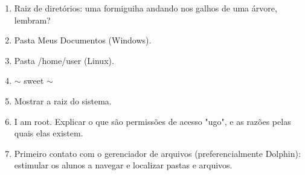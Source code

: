 \begin{enumerate}
	\item Raiz de diretórios: uma formiguiha andando nos galhos de uma árvore, lembram?
	\item Pasta Meus Documentos (Windows).
	\item Pasta /home/user (Linux).
	\item $\sim$ sweet $\sim$
	\item Mostrar a raiz do sistema.
	\item I am root. Explicar o que são permissões de acesso "ugo", e as razões pelas quais elas existem.
	\item Primeiro contato com o gerenciador de arquivos (preferencialmente Dolphin): estimular os alunos a navegar e localizar pastas e arquivos.
\end{enumerate}
